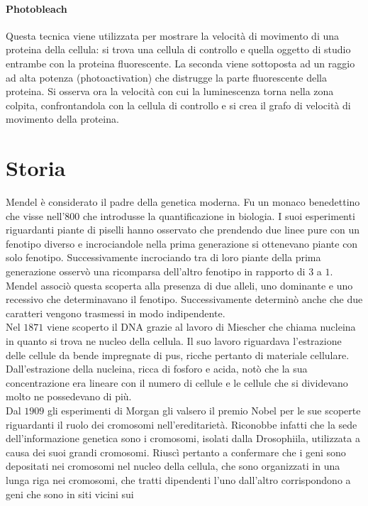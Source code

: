 \paragraph{Photobleach}
Questa tecnica viene utilizzata per mostrare la velocit\`a di movimento di una proteina della cellula: si trova una cellula di controllo e quella oggetto di 
studio entrambe con la proteina fluorescente. La seconda viene sottoposta ad un raggio ad alta potenza (photoactivation) che distrugge la parte fluorescente
della proteina. Si osserva ora la velocit\`a con cui la luminescenza torna nella zona colpita, confrontandola con la cellula di controllo e si crea il grafo
di velocit\`a di movimento della proteina.
\section{Storia}
Mendel \`e considerato il padre della genetica moderna. Fu un monaco benedettino che visse nell'800 che introdusse la quantificazione in biologia. I suoi esperimenti riguardanti piante 
di piselli hanno osservato che prendendo due linee pure con un fenotipo diverso e incrociandole nella prima generazione si ottenevano piante con solo fenotipo. Successivamente 
incrociando tra di loro piante della prima generazione osserv\`o una ricomparsa dell'altro fenotipo in rapporto di $3$ a $1$. Mendel associ\`o questa scoperta alla presenza di due 
alleli, uno dominante e uno recessivo che determinavano il fenotipo. Successivamente determin\`o anche che due caratteri vengono trasmessi in modo indipendente. \\
Nel $1871$ viene scoperto il DNA grazie al lavoro di Miescher che chiama nucleina in quanto si trova ne nucleo della cellula. Il suo lavoro riguardava l'estrazione delle cellule da
bende impregnate di pus, ricche pertanto di materiale cellulare. Dall'estrazione della nucleina, ricca di fosforo e acida,  not\`o che la sua concentrazione era lineare con il numero di 
cellule e le cellule che si dividevano molto ne possedevano di pi\`u.\\
Dal $1909$ gli esperimenti di Morgan gli valsero il premio Nobel per le sue scoperte riguardanti il ruolo dei cromosomi nell'ereditariet\`a. Riconobbe infatti che la sede 
dell'informazione genetica sono i cromosomi, isolati dalla Drosophiila, utilizzata a causa dei suoi grandi cromosomi. Riusc\`i pertanto a confermare che i geni sono depositati nei 
cromosomi nel nucleo della cellula, che sono organizzati in una lunga riga nei cromosomi, che tratti dipendenti l'uno dall'altro corrispondono a geni che sono in siti vicini sui 
